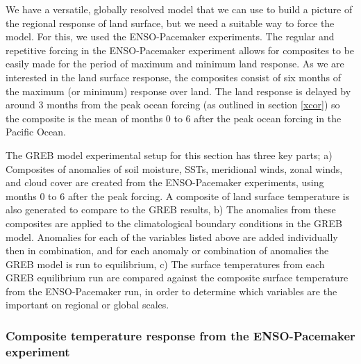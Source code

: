 We have a versatile, globally resolved model that we can use to build a picture 
of the regional response of land surface, but we need a suitable way to force 
the model. For this, we used the ENSO-Pacemaker experiments. The regular and 
repetitive forcing in the ENSO-Pacemaker experiment allows for composites to be 
easily made for the period of maximum and minimum land response.  As we are 
interested in the land surface response, the composites consist of six months of 
the maximum (or minimum) response over land. The land response is delayed by 
around 3 months from the peak ocean forcing (as outlined in section \ref{xcor}) 
so the composite is the mean of months 0 to 6 after the peak ocean forcing in 
the Pacific Ocean. 

The GREB model experimental setup for this section has three key parts; a) 
Composites of anomalies of soil moisture, SSTs, meridional winds, zonal winds, 
and cloud cover are created from the ENSO-Pacemaker experiments, using months 0 
to 6 after the peak forcing.  A composite of land surface temperature is also 
generated to compare to the GREB results, b) The anomalies from these composites 
are applied to the climatological boundary conditions in the GREB model.  
Anomalies for each of the variables listed above are added individually then in 
combination, and for each anomaly or combination of anomalies the GREB model is 
run to equilibrium, c) The surface temperatures from each GREB equilibrium run 
are compared against the composite surface temperature from the ENSO-Pacemaker 
run, in order to determine which variables are the important on regional or 
global scales.

\subsubsection{Composite temperature response from the ENSO-Pacemaker 
experiment}


